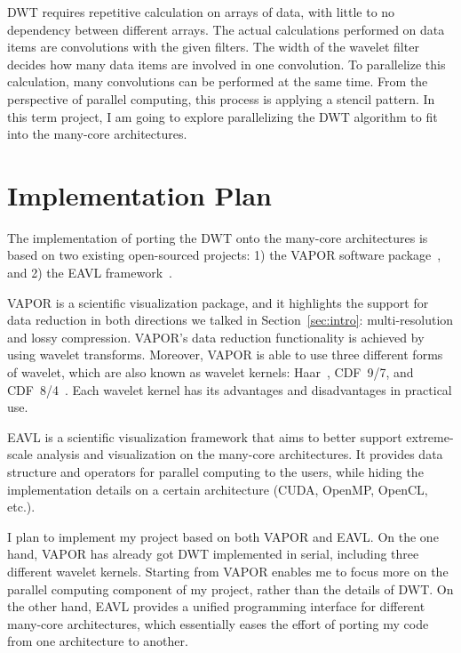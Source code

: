 \documentclass{article}
\begin{document}
DWT requires repetitive calculation on arrays of data, with little to no
dependency between different arrays.
%
The actual calculations performed on data items are convolutions
with the given filters. 
%
The width of the wavelet filter decides how many data items are 
involved in one convolution.
%
To parallelize this calculation, many convolutions can be performed
at the same time.
%
From the perspective of parallel computing, this process is applying
a stencil pattern.
%
%
In this term project, I am going to explore parallelizing the DWT algorithm 
to fit into the many-core architectures.


\section{Implementation Plan}
The implementation of porting the DWT onto the many-core architectures
is based on two existing open-sourced projects: 1) the VAPOR software 
package~\cite{clyne2007interactive},
and 2) the EAVL framework~\cite{meredith2012distributed}.

VAPOR is a scientific visualization package, and it highlights the 
support for data reduction in both directions we talked in
Section~\ref{sec:intro}: multi-resolution and lossy compression.
%
VAPOR's data reduction functionality is achieved by using wavelet transforms.
%
Moreover, VAPOR is able to use three different forms of wavelet, which 
are also known as wavelet kernels: Haar~\cite{haar1910theorie}, 
CDF~9/7, and CDF~8/4~\cite{cohen1992biorthogonal}.
%
Each wavelet kernel has its advantages and disadvantages in practical use.

EAVL is a scientific visualization framework that aims to better support
extreme-scale analysis and visualization on the many-core architectures.
%
It provides data structure and operators for parallel computing to the 
users, while hiding the implementation details on a certain architecture
(CUDA, OpenMP, OpenCL, etc.).

I plan to implement my project based on both VAPOR and EAVL. 
%
On the one hand, VAPOR has already got DWT implemented in serial, 
including three different wavelet kernels.
%
Starting from VAPOR enables me to focus more on the parallel computing 
component of my project, rather than the details of DWT.
%
On the other hand, EAVL provides a unified programming interface for 
different many-core architectures, which essentially eases the effort
of porting my code from one architecture to another.
\end{document}
